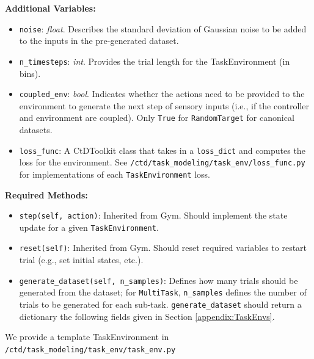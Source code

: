 \documentclass{article}
\begin{document}
\textbf{Additional Variables:}

\begin{itemize}
    \item \texttt{noise}: \textit{float}. Describes the standard deviation of Gaussian noise to be added to the inputs in the pre-generated dataset.
    \item \texttt{n\_timesteps}: \textit{int}. Provides the trial length for the TaskEnvironment (in bins).
    \item \texttt{coupled\_env}: \textit{bool}. Indicates whether the actions need to be provided to the environment to generate the next step of sensory inputs (i.e., if the controller and environment are coupled). Only \texttt{True} for \texttt{RandomTarget} for canonical datasets.
    \item \texttt{loss\_func}: A CtDToolkit class that takes in a \texttt{loss\_dict} and computes the loss for the environment. See \texttt{/ctd/task\_modeling/task\_env/loss\_func.py} for implementations of each \texttt{TaskEnvironment} loss.
\end{itemize}

\textbf{Required Methods:}

\begin{itemize}
    \item \texttt{step(self, action)}: Inherited from Gym. Should implement the state update for a given \texttt{TaskEnvironment}.
    \item \texttt{reset(self)}: Inherited from Gym. Should reset required variables to restart trial (e.g., set initial states, etc.).
    \item \texttt{generate\_dataset(self, n\_samples)}: Defines how many trials should be generated from the dataset; for \texttt{MultiTask}, \texttt{n\_samples} defines the number of trials to be generated for each sub-task. \texttt{generate\_dataset} should return a dictionary the following fields given in Section \ref{appendix:TaskEnvs}.
\end{itemize}

We provide a template TaskEnvironment in \texttt{/ctd/task\_modeling/task\_env/task\_env.py}
\end{document}
